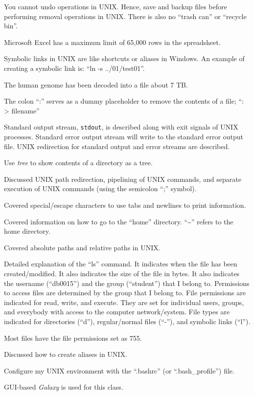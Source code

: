 You cannot undo operations in UNIX. Hence, save and backup files before performing removal operations in UNIX. There is also no ``trash can'' or ``recycle bin''.

Microsoft Excel has a maximum limit of 65,000 rows in the spreadsheet.

Symbolic links in UNIX are like shortcuts or aliases in Windows. An example of creating a symbolic link is: ``ln -s ../01/test01''.

The human genome has been decoded into a file about 7 TB.

The colon ``:'' serves as a dummy placeholder to remove the contents of a file; ``: > filename''

Standard output stream, {\tt stdout}, is described along with exit signals of UNIX processes. Standard error output stream will write to the standard error output file. UNIX redirection for standard output and error streams are described.

Use {\it tree} to show contents of a directory as a tree.

Discussed UNIX path redirection, pipelining of UNIX commands, and separate execution of UNIX commands (using the semicolon ``;'' symbol).

Covered special/escape characters to use tabs and newlines to print information.

Covered information on how to go to the ``home'' directory. ``\sim'' refers to the home directory.


Covered absolute paths and relative paths in UNIX.

Detailed explanation of the ``ls'' command. It indicates when the file has been created/modified. It also indicates the size of the file in bytes. It also indicates the username (``db0015'') and the group (``student'') that I belong to. Permissions to access files are determined by the group that I belong to. File permissions are indicated for read, write, and execute. They are set for individual users, groups, and everybody with access to the computer network/system. File types are indicated for directories (``d''), regular/normal files (``-''), and symbolic links (``l'').

Most files have the file permissions set as 755.

Discussed how to create aliases in UNIX.

Configure my UNIX environment with the ``.bashrc'' (or ``.bash_profile'') file.

GUI-based {\it Galaxy} is used for this class.








